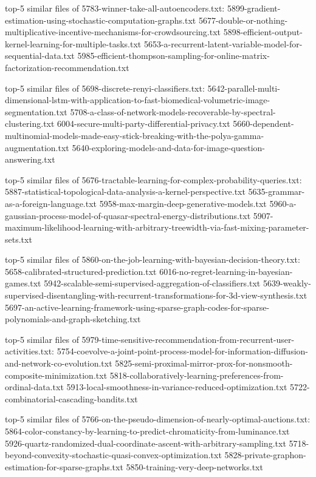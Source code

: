 \documentclass[11pt]{article}
\begin{document}
top-5 similar files of 5783-winner-take-all-autoencoders.txt:
5899-gradient-estimation-using-stochastic-computation-graphs.txt
5677-double-or-nothing-multiplicative-incentive-mechanisms-for-crowdsourcing.txt
5898-efficient-output-kernel-learning-for-multiple-tasks.txt
5653-a-recurrent-latent-variable-model-for-sequential-data.txt
5985-efficient-thompson-sampling-for-online-matrix-factorization-recommendation.txt

top-5 similar files of 5698-discrete-renyi-classifiers.txt:
5642-parallel-multi-dimensional-lstm-with-application-to-fast-biomedical-volumetric-image-segmentation.txt
5708-a-class-of-network-models-recoverable-by-spectral-clustering.txt
6004-secure-multi-party-differential-privacy.txt
5660-dependent-multinomial-models-made-easy-stick-breaking-with-the-polya-gamma-augmentation.txt
5640-exploring-models-and-data-for-image-question-answering.txt

top-5 similar files of
5676-tractable-learning-for-complex-probability-queries.txt:
5887-statistical-topological-data-analysis-a-kernel-perspective.txt
5635-grammar-as-a-foreign-language.txt
5958-max-margin-deep-generative-models.txt
5960-a-gaussian-process-model-of-quasar-spectral-energy-distributions.txt
5907-maximum-likelihood-learning-with-arbitrary-treewidth-via-fast-mixing-parameter-sets.txt

top-5 similar files of
5860-on-the-job-learning-with-bayesian-decision-theory.txt:
5658-calibrated-structured-prediction.txt
6016-no-regret-learning-in-bayesian-games.txt
5942-scalable-semi-supervised-aggregation-of-classifiers.txt
5639-weakly-supervised-disentangling-with-recurrent-transformations-for-3d-view-synthesis.txt
5697-an-active-learning-framework-using-sparse-graph-codes-for-sparse-polynomials-and-graph-sketching.txt

top-5 similar files of
5979-time-sensitive-recommendation-from-recurrent-user-activities.txt:
5754-coevolve-a-joint-point-process-model-for-information-diffusion-and-network-co-evolution.txt
5825-semi-proximal-mirror-prox-for-nonsmooth-composite-minimization.txt
5818-collaboratively-learning-preferences-from-ordinal-data.txt
5913-local-smoothness-in-variance-reduced-optimization.txt
5722-combinatorial-cascading-bandits.txt

top-5 similar files of
5766-on-the-pseudo-dimension-of-nearly-optimal-auctions.txt:
5864-color-constancy-by-learning-to-predict-chromaticity-from-luminance.txt
5926-quartz-randomized-dual-coordinate-ascent-with-arbitrary-sampling.txt
5718-beyond-convexity-stochastic-quasi-convex-optimization.txt
5828-private-graphon-estimation-for-sparse-graphs.txt
5850-training-very-deep-networks.txt
\end{document}
